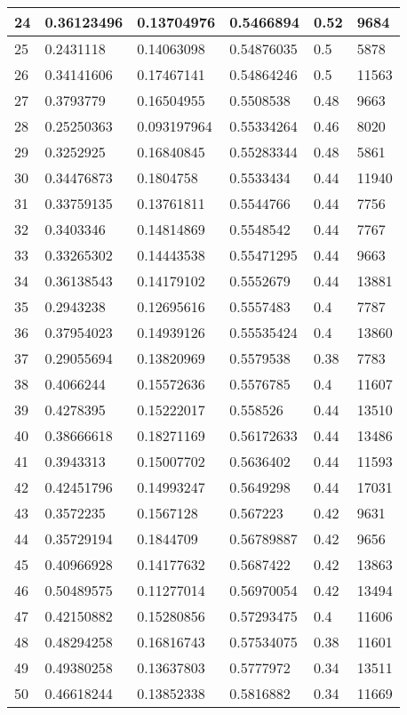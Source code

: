 \begin{longtable}{|l|l|l|l|l|l|}
24 & 0.36123496 & 0.13704976 & 0.5466894 & 0.52 & 9684 \\ \hline 
25 & 0.2431118 & 0.14063098 & 0.54876035 & 0.5 & 5878 \\ \hline 
26 & 0.34141606 & 0.17467141 & 0.54864246 & 0.5 & 11563 \\ \hline 
27 & 0.3793779 & 0.16504955 & 0.5508538 & 0.48 & 9663 \\ \hline 
28 & 0.25250363 & 0.093197964 & 0.55334264 & 0.46 & 8020 \\ \hline 
29 & 0.3252925 & 0.16840845 & 0.55283344 & 0.48 & 5861 \\ \hline 
30 & 0.34476873 & 0.1804758 & 0.5533434 & 0.44 & 11940 \\ \hline 
31 & 0.33759135 & 0.13761811 & 0.5544766 & 0.44 & 7756 \\ \hline 
32 & 0.3403346 & 0.14814869 & 0.5548542 & 0.44 & 7767 \\ \hline 
33 & 0.33265302 & 0.14443538 & 0.55471295 & 0.44 & 9663 \\ \hline 
34 & 0.36138543 & 0.14179102 & 0.5552679 & 0.44 & 13881 \\ \hline 
35 & 0.2943238 & 0.12695616 & 0.5557483 & 0.4 & 7787 \\ \hline 
36 & 0.37954023 & 0.14939126 & 0.55535424 & 0.4 & 13860 \\ \hline 
37 & 0.29055694 & 0.13820969 & 0.5579538 & 0.38 & 7783 \\ \hline 
38 & 0.4066244 & 0.15572636 & 0.5576785 & 0.4 & 11607 \\ \hline 
39 & 0.4278395 & 0.15222017 & 0.558526 & 0.44 & 13510 \\ \hline 
40 & 0.38666618 & 0.18271169 & 0.56172633 & 0.44 & 13486 \\ \hline 
41 & 0.3943313 & 0.15007702 & 0.5636402 & 0.44 & 11593 \\ \hline 
42 & 0.42451796 & 0.14993247 & 0.5649298 & 0.44 & 17031 \\ \hline 
43 & 0.3572235 & 0.1567128 & 0.567223 & 0.42 & 9631 \\ \hline 
44 & 0.35729194 & 0.1844709 & 0.56789887 & 0.42 & 9656 \\ \hline 
45 & 0.40966928 & 0.14177632 & 0.5687422 & 0.42 & 13863 \\ \hline 
46 & 0.50489575 & 0.11277014 & 0.56970054 & 0.42 & 13494 \\ \hline 
47 & 0.42150882 & 0.15280856 & 0.57293475 & 0.4 & 11606 \\ \hline 
48 & 0.48294258 & 0.16816743 & 0.57534075 & 0.38 & 11601 \\ \hline 
49 & 0.49380258 & 0.13637803 & 0.5777972 & 0.34 & 13511 \\ \hline 
50 & 0.46618244 & 0.13852338 & 0.5816882 & 0.34 & 11669 \\ \hline 
\end{longtable}